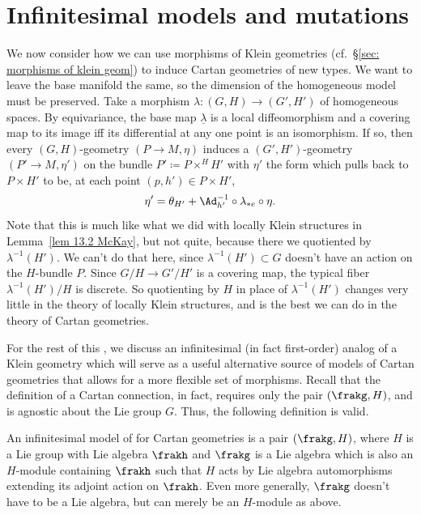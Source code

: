 \section{Infinitesimal models and mutations}


We now consider how we can use morphisms of Klein geometries (cf.\ \S\ref{sec: morphisms of klein geom}) to induce Cartan geometries of new types. We want to leave the base manifold the same, so the dimension of the homogeneous model must be preserved. Take a morphism $\lambda:(G,H)\to (G',H')$ of homogeneous spaces. By equivariance, the base map $\underline{\lambda}$ is a local diffeomorphism and a covering map to its image iff its differential at any one point is an isomorphism. If so, then every $(G,H)$-geometry $(P\to M,\eta)$ induces a $(G',H')$-geometry $(P'\to M,\eta')$ on the bundle $P'\coloneqq P\times^H H'$ with $\eta'$ the form which pulls back to $P\times H'$ to be, at each point $(p,h')\in P\times H'$, 
\[\eta'=\theta_{H'}+\Ad_{h'}^{-1}\circ\lambda_{\ast e}\circ \eta.\]
Note that this is much like what we did with locally Klein structures in Lemma~\ref{lem 13.2 McKay}, but not quite, because there we quotiented by $\lambda^{-1}(H')$. We can't do that here, since $\lambda^{-1}(H')\subset G$ doesn't have an action on the $H$-bundle $P$. Since $G\slash H\to G'\slash H'$ is a covering map, the typical fiber $\lambda^{-1}(H')\slash H$ is discrete. So quotienting by $H$ in place of $\lambda^{-1}(H')$ changes very little in the theory of locally Klein structures, and is the best we can do in the theory of Cartan geometries.


For the rest of this \sect, we discuss an infinitesimal (in fact first-order) analog of a Klein geometry which will serve as a useful alternative source of models of Cartan geometries that allows for a more flexible set of morphisms. Recall that the definition of a Cartan connection, in fact, requires only the pair $(\frakg,H)$, and is agnostic about the Lie group $G$. Thus, the following definition is valid.

\begin{defn}
    An infinitesimal model of for Cartan geometries is a pair $(\frakg,H)$, where $H$ is a Lie group with Lie algebra $\frakh$ and $\frakg$ is a Lie algebra which is also an $H$-module containing $\frakh$ such that $H$ acts by Lie algebra automorphisms extending its adjoint action on $\frakh$. Even more generally, $\frakg$ doesn't have to be a Lie algebra, but can merely be an $H$-module as above.
\end{defn}

